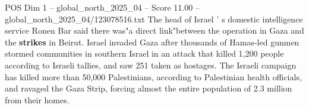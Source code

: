 \begin{textsample}{POS Dim 1 – global\_north\_2025\_04 – Score 11.00 – global\_north\_2025\_04/123078516.txt}
The head of Israel ' s domestic intelligence service Ronen Bar said there was"a direct link"between the operation in Gaza and the \textbf{strikes} in Beirut.
Israel invaded Gaza after thousands of Hamas-led gunmen stormed communities in southern Israel in an attack that killed 1,200 people according to Israeli tallies, and saw 251 taken as hostages.
The Israeli campaign has killed more than 50,000 Palestinians, according to Palestinian health officials, and ravaged the Gaza Strip, forcing almost the entire population of 2.3 million from their homes.

\end{textsample}
